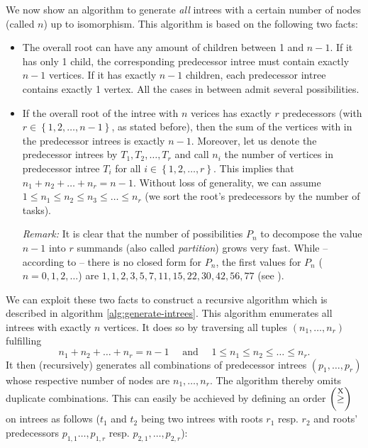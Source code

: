 We now show an algorithm to generate \emph{all} intrees with a certain number of nodes (called $n$) up to isomorphism. This algorithm is based on the following two facts: 

\begin{itemize}
  \item The overall root can have any amount of children between 1 and $n-1$. If it has only 1 child, the corresponding predecessor intree must contain exactly $n-1$ vertices. If it has exactly $n-1$ children, each predecessor intree contains exactly 1 vertex. All the cases in between admit several possibilities.
  \item If the overall root of the intree with $n$ verices has exactly $r$ predecessors (with $r \in \left\{ 1,2,\dots,n-1 \right\}$, as stated before), then the sum of the vertices with in the predecessor intrees is exactly $n-1$. Moreover, let us denote the predecessor intrees by $T_1,T_2,\dots,T_r$ and call $n_i$ the number of vertices in predecessor intree $T_i$ for all $i\in\left\{1,2,\dots,r \right\}$. This implies that $n_1+n_2+\dots+n_r=n-1$. Without loss of generality, we can assume $1 \leq n_1 \leq n_2 \leq n_3 \leq \dots \leq n_r$ (we sort the root's predecessors by the number of tasks).

    \emph{Remark:} It is clear that the number of possibilities $P_n$ to decompose the value $n-1$ into $r$ summands (also called \emph{partition}) grows very fast. While -- according to \cite{concretemathematics} -- there is no closed form for $P_n$, the first values for $P_n$ ($n=0,1,2,\dots$) are $1,1,2,3,5,7,11,15,22,30,42,56,77$ (see \cite{oeispartitionnumbers}).
\end{itemize}

We can exploit these two facts to construct a recursive algorithm which is described in algorithm \ref{alg:generate-intrees}. This algorithm enumerates all intrees with exactly $n$ vertices. It does so by traversing all tuples $(n_1,\dots,n_r)$ fulfilling
\begin{equation*}
  n_1 + n_2 + \dots + n_r = n-1 \quad \text{ and } \quad 1\leq n_1\leq n_2\leq\dots\leq n_r.
\end{equation*}
It then (recursively) generates all combinations of predecessor intrees $(p_1,\dots,p_r)$ whose respective number of nodes are $n_1,\dots,n_r$. The algorithm thereby omits duplicate combinations. This can easily be acchieved by defining an order $\left(\stackrel{\text{X}}{\geq}\right)$ on intrees as follows ($t_1$ and $t_2$ being two intrees with roots $r_1$ resp. $r_2$ and roots' predecessors $p_{1,1}\dots,p_{1,r}$ resp. $p_{2,1},\dots,p_{2,r}$):

